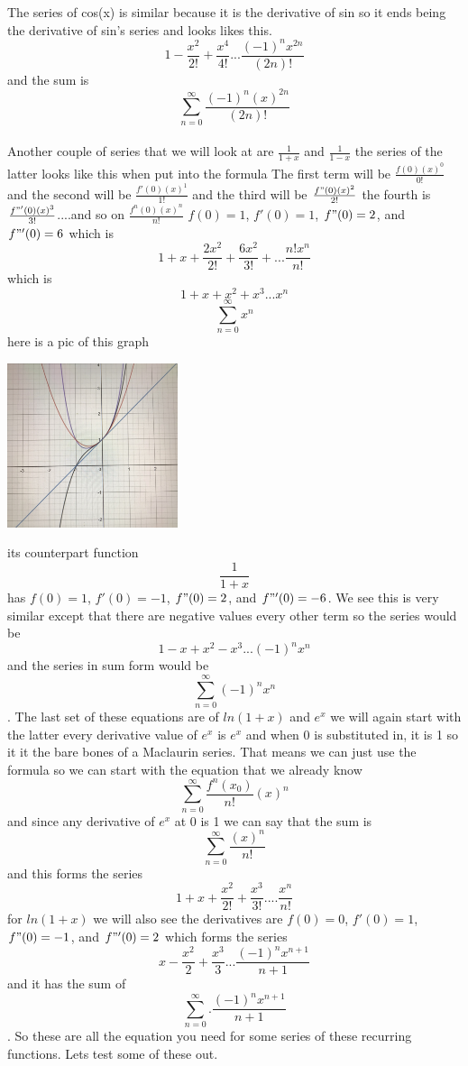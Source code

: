 \documentclass[a4paper,openright, 14pt]{article}
\begin{document}
The series of cos(x) is similar because it is the derivative of sin so it ends being the derivative of sin's series and looks likes this. $$1-\frac{x^2}{2!}+\frac{x^4}{4!}...\frac{(-1)^nx^{2n}}{(2n)!}$$ and the sum is $$\sum_{n=0} ^\infty \frac{(-1)^n(x)^{2n}}{(2n)!}$$
\\ Another couple of series that we will look at are $\frac{1}{1+x}$ and $\frac{1}{1-x}$ the series of the latter looks like this when put into the formula The first term will be $\frac{f(0)(x)^0}{0!}$ and the second will be $\frac{f'(0)(x)^1}{1!}$ and the third will be $\frac{f"(0)(x)^2}{2!}$ the fourth is $\frac{f"'(0)(x)^3}{3!}$....and so on $\frac{f^n(0)(x)^n}{n!}$ 
$f(0)=1$, $f'(0)=1$, $f"(0)=2$, and $f"'(0)=6$ which is $$1+x+\frac{2x^2}{2!}+\frac{6x^2}{3!}+...\frac{n!x^n}{n!}$$ which is $$1+x+x^2+x^3...x^n$$  $$\sum_{n=0} ^\infty x^n$$ here is a pic of this graph 
\begin{center}
    \includegraphics[width = 5cm, height = 5 cm]{imsotired.jpeg}
\end{center} 
its counterpart function $$\frac{1}{1+x}$$ has $f(0)=1$, $f'(0)=-1$, $f"(0)=2$, and $f"'(0)=-6$. We see this is very similar except that there are negative values every other term so the series would be $$1-x+x^2-x^3...(-1)^nx^n$$
and the series in sum form would be $$\sum_{n=0} ^\infty (-1)^nx^n$$. The last set of these equations are of $ln(1+x)$ and $e^x$ we will again start with the latter every derivative value of $e^x$ is $e^x$ and when $0$ is substituted in, it is 1 so it it the bare bones of a  Maclaurin series. That means we can just use the formula so we can start with the equation that we already know $$\sum_{n=0} ^\infty \frac{f^n(x_0)}{n!} (x)^n$$ and since any derivative of $e^x$ at 0 is 1 we can say that the sum is $$\sum_{n=0} ^\infty \frac{(x)^n}{n!}$$ and this forms the series $$1+x+\frac{x^2}{2!}+\frac{x^3}{3!}....\frac{x^n}{n!}$$ for $ln(1+x)$ we will also see the derivatives are $f(0)=0$, $f'(0)=1$, $f"(0)=-1$, and $f"'(0)=2$ which forms the series
$$x-\frac{x^2}{2}+\frac{x^3}{3}...\frac{(-1)^nx^{n+1}}{n+1}$$ and it has the sum of $$\sum_{n=0} ^\infty.\frac{(-1)^nx^{n+1}}{n+1}$$. So these are all the equation you need for some series of these recurring functions. Lets test some of these out.
\end{document}
